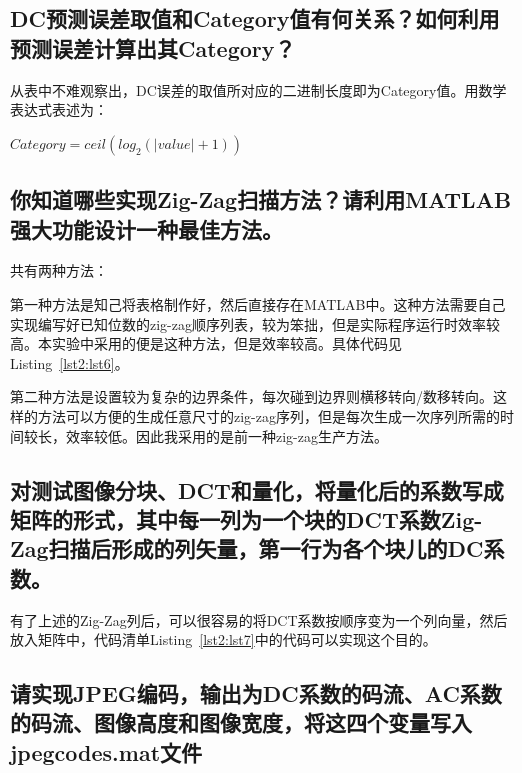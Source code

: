 \documentclass[a4paper]{article}
\begin{document}
	\subsection{DC预测误差取值和Category值有何关系？如何利用预测误差计算出其Category？}
	
	从表中不难观察出，DC误差的取值所对应的二进制长度即为Category值。用数学表达式表述为：
	\begin{center}
		$ Category = ceil(log_2(|value| + 1)) $
	\end{center}
	
	\subsection{你知道哪些实现Zig-Zag扫描方法？请利用MATLAB强大功能设计一种最佳方法。}
	
	共有两种方法：
	
	第一种方法是知己将表格制作好，然后直接存在MATLAB中。这种方法需要自己实现编写好已知位数的zig-zag顺序列表，较为笨拙，但是实际程序运行时效率较高。本实验中采用的便是这种方法，但是效率较高。具体代码见Listing~\ref{lst2:lst6}。
	
	
	
	第二种方法是设置较为复杂的边界条件，每次碰到边界则横移转向/数移转向。这样的方法可以方便的生成任意尺寸的zig-zag序列，但是每次生成一次序列所需的时间较长，效率较低。因此我采用的是前一种zig-zag生产方法。
	
	\subsection{对测试图像分块、DCT和量化，将量化后的系数写成矩阵的形式，其中每一列为一个块的DCT系数Zig-Zag扫描后形成的列矢量，第一行为各个块儿的DC系数。}
	
	有了上述的Zig-Zag列后，可以很容易的将DCT系数按顺序变为一个列向量，然后放入矩阵中，代码清单Listing~\ref{lst2:lst7}中的代码可以实现这个目的。
	
	
	
	\subsection{请实现JPEG编码，输出为DC系数的码流、AC系数的码流、图像高度和图像宽度，将这四个变量写入jpegcodes.mat文件}
	
\end{document}

